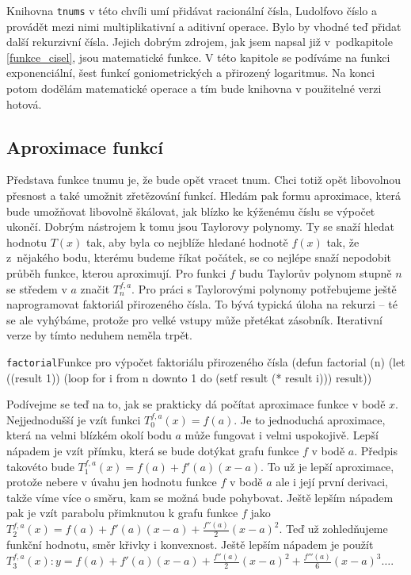 Knihovna \texttt{tnums} v této chvíli umí přidávat racionální čísla, Ludolfovo číslo a provádět mezi nimi multiplikativní a aditivní operace. Bylo by vhodné teď přidat další rekurzivní čísla. Jejich dobrým zdrojem, jak jsem napsal již v~podkapitole \ref{funkce_cisel}, jsou matematické funkce. V této kapitole se podíváme na funkci exponenciální, šest funkcí goniometrických a přirozený logaritmus. Na konci potom dodělám matematické operace a tím bude knihovna v použitelné verzi hotová.

\subsection{Aproximace funkcí}
Představa funkce tnumu je, že bude opět vracet tnum. Chci totiž opět libovolnou přesnost a také umožnit zřetězování funkcí. Hledám pak formu aproximace, která bude umožňovat libovolně škálovat, jak blízko ke kýženému číslu se výpočet ukončí. Dobrým nástrojem k tomu jsou Taylorovy polynomy. Ty se snaží hledat hodnotu $T(x)$ tak, aby byla co nejblíže hledané hodnotě $f(x)$ tak, že z~nějakého bodu, kterému budeme říkat počátek, se co nejlépe snaží nepodobit průběh funkce, kterou aproximují. Pro funkci $f$ budu Taylorův polynom stupně $n$ se středem v $a$ značit $T^{f,a}_n$. Pro práci s Taylorovými polynomy potřebujeme ještě naprogramovat faktoriál přirozeného čísla. To bývá typická úloha na rekurzi -- té se ale vyhýbáme, protože pro velké vstupy může přetékat zásobník. Iterativní verze by tímto neduhem neměla trpět.

\begin{lispcode}{\texttt{factorial}}{Funkce pro výpočet faktoriálu přirozeného čísla}
(\textcolor{funkcionalni}{defun} \textcolor{pojmenovan}{factorial} (n)
  (\textcolor{vedlejsi}{let} ((result 1))
    (\textcolor{funkcionalni}{loop} \textcolor{obarvi}{for} i \textcolor{obarvi}{from} n \textcolor{obarvi}{downto} 1
      \textcolor{obarvi}{do} (\textcolor{vedlejsi}{setf} result (\textcolor{matematicke}{*} result i)))
    result))
\end{lispcode}

Podívejme se teď na to, jak se prakticky dá počítat aproximace funkce v bodě $x$. Nejjednodušší je vzít funkci $T^{f,a}_0(x) = f(a)$. Je to jednoduchá aproximace, která na velmi blízkém okolí bodu $a$ může fungovat i velmi uspokojivě. Lepší nápadem je vzít přímku, která se bude dotýkat grafu funkce $f$ v bodě $a$. Předpis takovéto bude $T^{f,a}_1(x) = f(a)+f'(a)(x-a)$. To už je lepší aproximace, protože nebere v úvahu jen hodnotu funkce $f$ v bodě $a$ ale i její první derivaci, takže víme více o směru, kam se možná bude pohybovat. Ještě lepším nápadem pak je vzít parabolu přimknutou k grafu funkce $f$ jako $T^{f,a}_2(x) = f(a)+f'(a)(x-a)+\frac{f''(a)}{2}(x-a)^2$. Teď už zohledňujeme funkční hodnotu, směr křivky i konvexnost. Ještě lepším nápadem je použít $T^{f,a}_3(x):y=f(a)+f'(a)(x-a)+\frac{f''(a)}{2}(x-a)^2+\frac{f'''(a)}{6}(x-a)^3\ldots$\cite{MTTP}.

